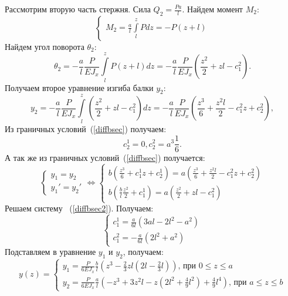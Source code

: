 \documentclass[12pt, a4paper]{article}
\begin{document}
Рассмотрим вторую часть стержня. Сила $Q_2 = \frac{P a}{l}$. 
Найдем момент $M_2$:
\begin{equation}
	\label{z2211}
	\begin{cases}
		M_2 = \frac{a}{l} \int\limits_l^z P d z = -P(z + l)
	\end{cases}
\end{equation}
Найдем угол поворота $\theta_2$:
\begin{equation}
	\label{z2222}
		\theta_2 = - \frac{a}{l} \frac{P}{E J_{x}} \int\limits_l^z P(z + l) d z = - \frac{a}{l} \frac{P}{E J_{x}} (\frac{z^2}{2} + z l - c_1^2). 
\end{equation}
Получаем второе уравнение изгиба балки $y_2$: 
\begin{equation}
	\label{z11332}
	y_2 =  - \frac{a}{l} \frac{P}{E J_{x}} \int\limits_l^z (\frac{z^2}{2} + z l - c_1^2) dz = - \frac{a}{l}  \frac{P}{E J_{x}} (\frac{z^3}{6} + \frac{z^2 l}{2} - c_1^2 z + c_2^2),
\end{equation}
Из граничных условий~(\ref{diffbsec}) получаем:
\begin{equation}
	\label{z113321213}
	c_2^1 = 0,
	c_2^2 = a^3 \frac{1}{6}.
\end{equation}
А так же из граничных условий~(\ref{diffbsec}) получается:
\begin{equation}
	\label{diffbsec2}
	\begin{cases}
		y_1 = y_2\\
		y_1' = y_2'
	\end{cases}
\Leftrightarrow
	\begin{cases}
	{b} (\frac{z^3}{6} + c_1^1 z + c_2^1) = {a}(\frac{z^3}{6} + \frac{z^2 l}{2} - c_1^2 z + c_2^2)\\
	b(\frac{b}{l} \frac{z^2}{2} + c_1^1) = a(\frac{z^2}{2} + z l - c_1^2)
\end{cases}
\end{equation}
Решаем систему ~(\ref{diffbsec2}). Получаем:
\begin{equation}
	\label{z113312213}
	\begin{cases}
		c_1^1 = \frac{a}{6 l} (3 a l - 2 l^2 - a^2)\\
		c_1^2 = -\frac{a}{6 l} (2 l^2 + a^2)
	\end{cases}
\end{equation}
Подставляем в уравнение $y_1$ и $y_2$, получаем:
\begin{equation}
	\label{z2diff}
	y(z) = 
	\begin{cases}
		y_1 = \frac{P}{6 E J_{x}} \frac{b}{l} (z^3 - \frac{2}{3} z l(2 l - \frac{2}{3}l))\mbox{, при } 0 \leqslant z \leqslant a\\
		y_2 = \frac{P}{6 E J_{x}} \frac{a}{l} (-z^3 + 3 z^2 l - z(2 l^2 + \frac{4}{9} l^2) + \frac{4}{9}l^4)\mbox{, при } a \leqslant z \leqslant b
	\end{cases}
\end{equation}
\end{document}
